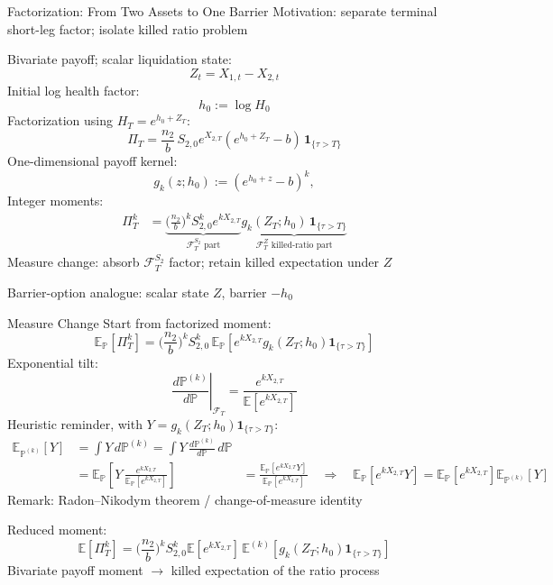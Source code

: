 \documentclass[aspectratio=169,10pt]{beamer}
\newcommand{\E}{\mathbb{E}}
\newcommand{\Pbb}{\mathbb{P}}
\newcommand{\one}{\mathbf{1}}
\begin{document}
\begin{frame}{Factorization: From Two Assets to One Barrier}
  \small
  Motivation: separate terminal short-leg factor; isolate killed ratio problem
  \vspace{0.25em}

  Bivariate payoff; scalar liquidation state:
  \[
    Z_t=X_{1,t}-X_{2,t}
  \]
  Initial log health factor:
  \[
    h_0:=\log H_0
  \]
  Factorization using $H_T=e^{h_0+Z_T}$:
  \[
    \Pi_T
    =
    \frac{n_2}{b}\,S_{2,0}e^{X_{2,T}}
    (e^{h_0+Z_T}-b)\,\one_{\{\tau>T\}}
  \]
  One-dimensional payoff kernel:
  \[
    g_k(z;h_0):=(e^{h_0+z}-b)^k,
  \]
  Integer moments:
  \[
  \begin{aligned}
    \Pi_T^k
    &=
    \underbrace{
      \Big(\frac{n_2}{b}\Big)^kS_{2,0}^k e^{kX_{2,T}}
    }_{\mathcal F_T^{S_2}\text{ part}}
    \underbrace{
      g_k(Z_T;h_0)\,\one_{\{\tau>T\}}
    }_{\mathcal F_T^{Z}\text{ killed-ratio part}}
  \end{aligned}
  \]
  Measure change: absorb $\mathcal F_T^{S_2}$ factor; retain killed expectation under $Z$
  \vspace{0.3em}

  Barrier-option analogue: scalar state $Z$, barrier $-h_0$
\end{frame}

\begin{frame}{Measure Change}
  \scriptsize
  Start from factorized moment:
  \[
    \E_\Pbb[\Pi_T^k]
    =
    \Big(\frac{n_2}{b}\Big)^kS_{2,0}^k\,
    \E_\Pbb\!\left[
      e^{kX_{2,T}}g_k(Z_T;h_0)\one_{\{\tau>T\}}
    \right]
  \]
  Exponential tilt:
  \[
    \left.\frac{d\Pbb^{(k)}}{d\Pbb}\right|_{\mathcal F_T}
    =
    \frac{e^{kX_{2,T}}}{\E[e^{kX_{2,T}}]}
  \]
  Heuristic reminder, with $Y=g_k(Z_T;h_0)\one_{\{\tau>T\}}$:
  \[
  \begin{aligned}
    \E_{\Pbb^{(k)}}[Y]
    &=
    \int Y\,d\Pbb^{(k)}
    =
    \int Y\,\frac{d\Pbb^{(k)}}{d\Pbb}\,d\Pbb\\
    &=
    \E_\Pbb\!\left[
      Y\,\frac{e^{kX_{2,T}}}{\E_\Pbb[e^{kX_{2,T}}]}
    \right]
    &=
    \frac{\E_\Pbb[e^{kX_{2,T}}Y]}{\E_\Pbb[e^{kX_{2,T}}]}
    \quad\Longrightarrow\quad
    \E_\Pbb[e^{kX_{2,T}}Y]
    =
    \E_\Pbb[e^{kX_{2,T}}]\E_{\Pbb^{(k)}}[Y]
  \end{aligned}
  \]
  {\scriptsize Remark: Radon--Nikodym theorem / change-of-measure identity}
  \vspace{0.15em}

  Reduced moment:
  \[
    \E[\Pi_T^k]
    =
    \Big(\frac{n_2}{b}\Big)^kS_{2,0}^k
    \E[e^{kX_{2,T}}]\,
    \E^{(k)}\!\left[
      g_k(Z_T;h_0)\one_{\{\tau>T\}}
    \right]
  \]
  Bivariate payoff moment $\rightarrow$ killed expectation of the ratio process
\end{frame}
\end{document}

